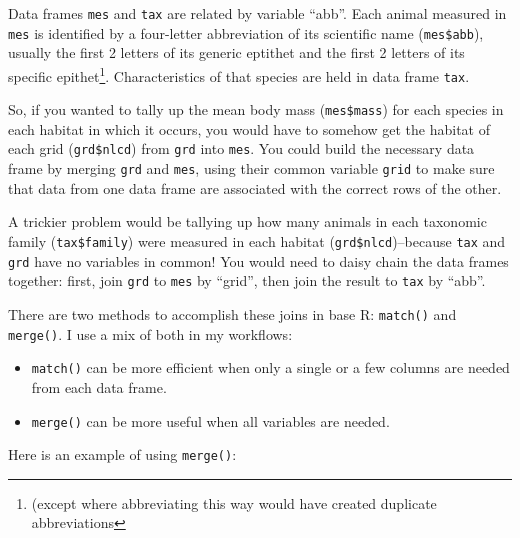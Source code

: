 \documentclass[
  13,
  letterpaper,
]{report}
\begin{document}
Data frames \texttt{mes} and \texttt{tax} are related by variable
``abb''. Each animal measured in \texttt{mes} is identified by a
four-letter abbreviation of its scientific name (\texttt{mes\$abb}),
usually the first 2 letters of its generic eptithet and the first 2
letters of its specific epithet\footnote{(except where abbreviating this
  way would have created duplicate abbreviations}. Characteristics of
that species are held in data frame \texttt{tax}.

So, if you wanted to tally up the mean body mass (\texttt{mes\$mass})
for each species in each habitat in which it occurs, you would have to
somehow get the habitat of each grid (\texttt{grd\$nlcd}) from
\texttt{grd} into \texttt{mes}. You could build the necessary data frame
by merging \texttt{grd} and \texttt{mes}, using their common variable
\texttt{grid} to make sure that data from one data frame are associated
with the correct rows of the other.

A trickier problem would be tallying up how many animals in each
taxonomic family (\texttt{tax\$family}) were measured in each habitat
(\texttt{grd\$nlcd})--because \texttt{tax} and \texttt{grd} have no
variables in common! You would need to daisy chain the data frames
together: first, join \texttt{grd} to \texttt{mes} by ``grid'', then
join the result to \texttt{tax} by ``abb''.

There are two methods to accomplish these joins in base R:
\texttt{match()} and \texttt{merge()}. I use a mix of both in my
workflows:

\begin{itemize}
\item
  \texttt{match()} can be more efficient when only a single or a few
  columns are needed from each data frame.
\item
  \texttt{merge()} can be more useful when all variables are needed.
\end{itemize}

Here is an example of using \texttt{merge()}:
\end{document}
